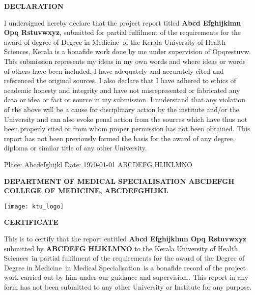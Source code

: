 \documentclass[12pt,a4paper]{report}
\def \reptitle{Abcd Efghijklmn Opq Rstuvwxyz}
\def \repauthor{ABCDEFG HIJKLMNO}
\def \repdegree{Degree in Medicine}
\def \repbranch{Medical Specialisation}
\def \repcollege{Abcdefgh College Of Medicine}
\def \repplace{Abcdefghijkl}
\def \repsupervisor{Opqrestuvw}
\def \repuniversity{Kerala University of Health Sciences}
\begin{document}
\clearpage
{}

\center\textbf{\Large DECLARATION}
\break

\justify 
{}I undersigned hereby declare that the project report titled \textbf{\reptitle}, submitted for partial fulfilment of the requirements for the award of degree of \repdegree\, of the \repuniversity, Kerala is a bonafide work done by me under supervision of \repsupervisor. This submission represents my ideas in my own words and where ideas or words of others have been included, I have adequately and accurately cited and referenced the original sources. I also declare that I have adhered to ethics of academic honesty and integrity and have not misrepresented or fabricated any data or idea or fact or source in my submission. I understand that any violation of the above will be a cause for disciplinary action by the institute and/or the University and can also evoke penal action from the sources which have thus not been properly cited or from whom proper permission has not been obtained. This report has not been previously formed the basis for the award of any degree, diploma or similar title of any other University.

\vspace{5cm} %
\begin{flushleft}
Place: \repplace \break
Date: \today 
\hfill \repauthor %
\end{flushleft}

\newpage 

\center\textbf{\large \MakeUppercase{department of \repbranch } \break
\MakeUppercase{\repcollege, \repplace}}

\texttt{[image: ktu\_logo]}\par

\center\textbf{\Large CERTIFICATE}

\justify
This is to certify that the report entitled \textbf{\large \reptitle} submitted by \textbf{\repauthor} to the \repuniversity\, in partial fulfilment of the requirements for the award of the Degree of \repdegree\, in \repbranch\,  is a bonafide record of the project work carried out by him under our guidance and supervision.. This report in any form has not been submitted to any other University or Institute for any purpose.
\end{document}

